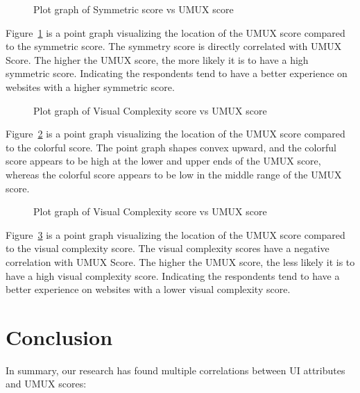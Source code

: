 \documentclass[conference]{IEEEtran}
\begin{document}
\begin{figure}[H]
    \centering
    \scalebox{0.57}{
        
    }
    \caption{Plot graph of Symmetric score vs UMUX score}
    \label{fig:symmetricumux}
\end{figure}

Figure~\ref{fig:symmetricumux} is a point graph visualizing the location of the UMUX score compared to the symmetric score. The symmetry score is directly correlated with UMUX Score. The higher the UMUX score, the more likely it is to have a high symmetric score. Indicating the respondents tend to have a better experience on websites with a higher symmetric score.

\begin{figure}[H]
    \centering
    \scalebox{0.57}{
        
    }
    \caption{Plot graph of Visual Complexity score vs UMUX score}
    \label{fig:colorfulumux}
\end{figure}

Figure~\ref{fig:colorfulumux} is a point graph visualizing the location of the UMUX score compared to the colorful score. The point graph shapes convex upward, and the colorful score appears to be high at the lower and upper ends of the UMUX score, whereas the colorful score appears to be low in the middle range of the UMUX score.

\begin{figure}[H]
    \centering
    \scalebox{0.57}{
        
    }
    \caption{Plot graph of Visual Complexity score vs UMUX score}
    \label{fig:viscomplexumux}
\end{figure}

Figure~\ref{fig:viscomplexumux} is a point graph visualizing the location of the UMUX score compared to the visual complexity score. The visual complexity scores have a negative correlation with UMUX Score. The higher the UMUX score, the less likely it is to have a high visual complexity score. Indicating the respondents tend to have a better experience on websites with a lower visual complexity score.

\section{Conclusion}

In summary, our research has found multiple correlations between UI attributes and UMUX scores:
\end{document}
